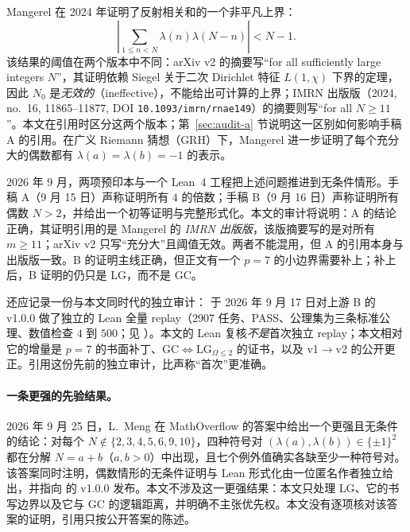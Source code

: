 \documentclass[11pt,a4paper]{ctexart}
\theoremstyle{plain}
\theoremstyle{definition}
\newcommand{\li}{\lambda}
\begin{document}
Mangerel 在 2024 年证明了反射相关和的一个非平凡上界\cite[Theorem~1.2]{mangerel2024}：
\begin{equation}
  \left|\sum_{1\le n<N}\li(n)\li(N-n)\right|<N-1.
  \label{eq:mangerel}
\end{equation}
该结果的阈值在两个版本中不同：arXiv v2 的摘要写“for all sufficiently large integers $N$”，其证明依赖 Siegel 关于二次 Dirichlet 特征 $L(1,\chi)$ 下界的定理，因此 $N_0$ 是\emph{无效的}（ineffective），不能给出可计算的上界\cite[Remark~1]{mangerel2024}；IMRN 出版版（2024, no.~16, 11865--11877, DOI \texttt{10.1093/imrn/rnae149}）的摘要则写“for all $N\ge11$”。本文在引用时区分这两个版本；第~\ref{sec:audit-a} 节说明这一区别如何影响手稿 A 的引用。在广义 Riemann 猜想（GRH）下，Mangerel 进一步证明了每个充分大的偶数都有 $\li(a)=\li(b)=-1$ 的表示\cite[Theorem~1.2]{mangerel2024b}。

2026 年 9 月，两项预印本与一个 Lean~4 工程把上述问题推进到无条件情形。手稿 A（9 月 15 日）声称证明所有 $4$ 的倍数；手稿 B（9 月 16 日）声称证明所有偶数 $N>2$，并给出一个初等证明与完整形式化\cite{captain2026four,captain2026general}。本文的审计将说明：A 的结论正确，其证明引用的是 Mangerel 的 \emph{IMRN 出版版}，该版摘要写的是对所有 $m\ge11$；arXiv v2 只写“充分大”且阈值无效。两者不能混用，但 A 的引用本身与出版版一致。B 的证明主线正确，但正文有一个 $p=7$ 的小边界需要补上；补上后，B 证明的仍只是 LG，而不是 GC。

还应记录一份与本文同时代的独立审计： 于 2026 年 9 月 17 日对上游 B 的 v1.0.0 做了独立的 Lean 全量 replay（2907 任务、PASS、公理集为三条标准公理、数值检查 $4$ 到 $500$；见 \cite{sunnyspot2026}）。本文的 Lean 复核\emph{不是}首次独立 replay；本文相对它的增量是 \(p=7\) 的书面补丁、\(\mathrm{GC}\iff\mathrm{LG}_{\Omega\le2}\) 的证书，以及 v1$\to$v2 的公开更正。引用这份先前的独立审计，比声称“首次”更准确。

\paragraph{一条更强的先验结果。}2026 年 9 月 25 日，L.~Meng 在 MathOverflow 的答案中给出一个更强且无条件的结论：对每个 $N\notin\{2,3,4,5,6,9,10\}$，四种符号对 $(\li(a),\li(b))\in\{\pm1\}^2$ 都在分解 $N=a+b$（$a,b>0$）中出现，且七个例外值确实各缺至少一种符号对。该答案同时注明，偶数情形的无条件证明与 Lean 形式化由一位匿名作者独立给出，并指向  的 v1.0.0 发布\cite{meng2026}。本文不涉及这一更强结果：本文只处理 LG、它的书写边界以及它与 GC 的逻辑距离，并明确不主张优先权。本文没有逐项核对该答案的证明，引用只按公开答案的陈述。
\end{document}
